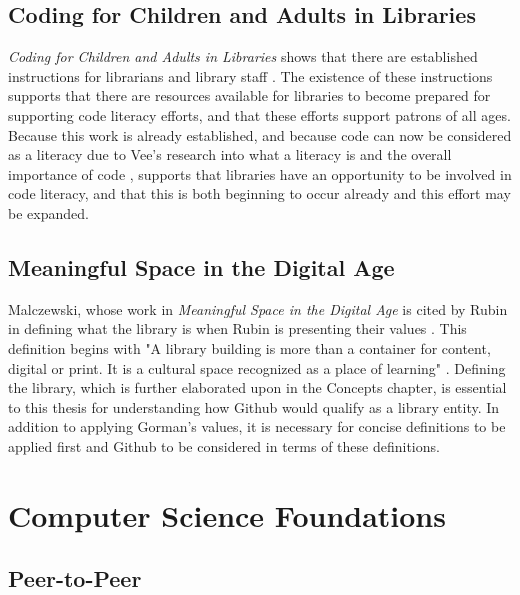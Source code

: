 \subsection{Coding for Children and Adults in Libraries}

\textit{Coding for Children and Adults in Libraries} shows that there are established instructions for librarians and library staff \cite{harrop2018codinglibrary}. The existence of these instructions supports that there are resources available for libraries to become prepared for supporting code literacy efforts, and that these efforts support patrons of all ages. Because this work is already established, and because code can now be considered as a literacy due to Vee's research into what a literacy is and the overall importance of code \cite{vee2017coding}, supports that libraries have an opportunity to be involved in code literacy, and that this is both beginning to occur already and this effort may be expanded. 

\subsection{Meaningful Space in the Digital Age}

Malczewski, whose work in \textit{Meaningful Space in the Digital Age} is cited by Rubin in defining what the library is when Rubin is presenting their values \cite{malczewski2014meaningful} \cite{rubin2016foundationslis}. This definition begins with "A library building is more than a container for content, digital or print. It is a cultural space recognized as a place of learning" \cite{rubin2016foundationslis}. Defining the library, which is further elaborated upon in the Concepts chapter, is essential to this thesis for understanding how Github would qualify as a library entity. In addition to applying Gorman's values, it is necessary for concise definitions to be applied first and Github to be considered in terms of these definitions. 

\section{Computer Science Foundations}

\subsection{Peer-to-Peer}

